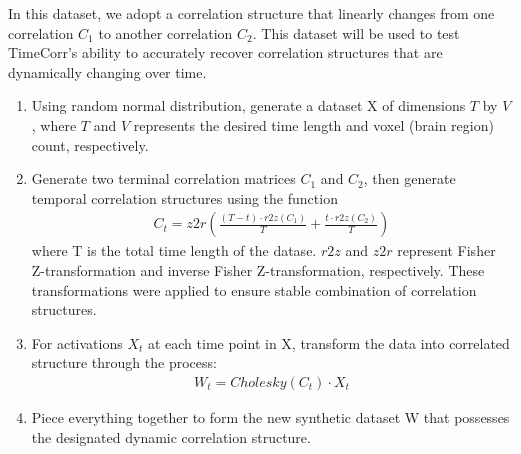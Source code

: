 \documentclass[11pt]{article}
\begin{document}
In this dataset, we adopt a correlation structure that linearly changes from one correlation $C_1$ to another correlation $C_2$. This dataset will be used to test TimeCorr's ability to accurately recover correlation structures that are dynamically changing over time.

\begin{enumerate}
\item Using random normal distribution, generate a dataset X of dimensions $T$ by $V$, where $T$ and $V$ represents the desired time length and voxel (brain region) count, respectively.
\item Generate two terminal correlation matrices $C_1$ and $C_2$, then generate temporal correlation structures using the function
\begin{align*}
C_t = z2r(\frac{(T-t) \cdot r2z(C_1)}{T} + \frac{t\cdot r2z(C_2)}{T})
\end{align*}
where T is the total time length of the datase. $r2z$ and $z2r$ represent Fisher Z-transformation and inverse Fisher Z-transformation, respectively. These transformations were applied to ensure stable combination of correlation structures.
\item For activations $X_t$ at each time point in X, transform the data into correlated structure through the process:
\begin{align*}
W_t = Cholesky(C_t) \cdot X_t
\end{align*}
\item Piece everything together to form the new synthetic dataset W that possesses the designated dynamic correlation structure.
\end{enumerate}
\end{document}
